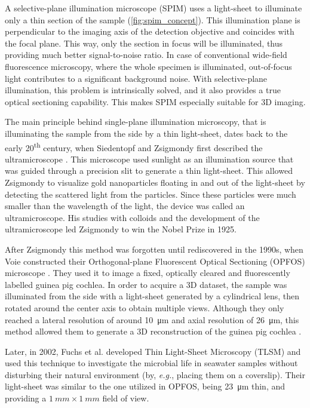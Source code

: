   A selective-plane illumination microscope (SPIM) uses a light-sheet to illuminate only a thin section of the sample (\autoref{fig:spim_concept}). This illumination plane is perpendicular to the imaging axis of the detection objective and coincides with the focal plane. This way, only the section in focus will be illuminated, thus providing much better signal-to-noise ratio. In case of conventional wide-field fluorescence microscopy, where the whole specimen is illuminated, out-of-focus light contributes to a significant background noise. 
  With selective-plane illumination, this problem is intrinsically solved, and it also provides a true optical sectioning capability. This makes SPIM especially suitable for 3D imaging.

  

  The main principle behind single-plane illumination microscopy, that is illuminating the sample from the side by a thin light-sheet, dates back to the early 20\textsuperscript{th} century, when Siedentopf and Zsigmondy first described the ultramicroscope \cite{siedentopf_uber_1902}. This microscope used sunlight as an illumination source that was guided through a precision slit to generate a thin light-sheet. This allowed Zsigmondy to visualize gold nanoparticles floating in and out of the light-sheet by detecting the scattered light from the particles.
  Since these particles were much smaller than the wavelength of the light, the device was called an ultramicroscope. His studies with colloids and the development of the ultramicroscope led Zsigmondy to win the Nobel Prize in 1925.

  After Zsigmondy this method was forgotten until rediscovered in the 1990s, when Voie \etal constructed their Orthogonal-plane Fluorescent Optical Sectioning (OPFOS) microscope \cite{voie_orthogonal-plane_1993}. They used it to image a fixed, optically cleared and fluorescently labelled guinea pig cochlea. In order to acquire a 3D dataset, the sample was illuminated from the side with a light-sheet generated by a cylindrical lens, then rotated around the center axis to obtain multiple views. Although they only reached a lateral resolution of around \SI{10}{\micro m} and axial resolution of \SI{26}{\micro m}, this method allowed them to generate a 3D reconstruction of the guinea pig cochlea \cite{voie_three-dimensional_1995}.

  Later, in 2002, Fuchs et al. developed Thin Light-Sheet Microscopy (TLSM) \cite{fuchs_thin_2002} and used this technique to investigate the microbial life in seawater samples without disturbing their natural environment (by, \textit{e.g.}, placing them on a coverslip). Their light-sheet was similar to the one utilized in OPFOS, being \SI{23}{\micro m} thin, and providing a $\SI{1}{mm} \times \SI{1}{mm}$ field of view.

